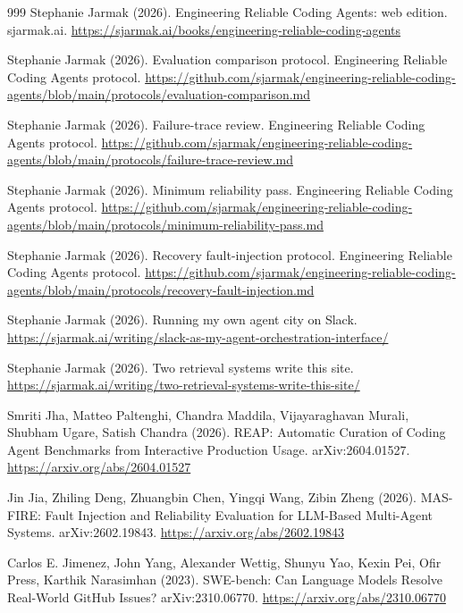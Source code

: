 \begin{thebibliography}{999}
 Stephanie Jarmak (2026). Engineering Reliable Coding Agents: web edition. sjarmak.ai. \url{https://sjarmak.ai/books/engineering-reliable-coding-agents}

 Stephanie Jarmak (2026). Evaluation comparison protocol. Engineering Reliable Coding Agents protocol. \url{https://github.com/sjarmak/engineering-reliable-coding-agents/blob/main/protocols/evaluation-comparison.md}

 Stephanie Jarmak (2026). Failure-trace review. Engineering Reliable Coding Agents protocol. \url{https://github.com/sjarmak/engineering-reliable-coding-agents/blob/main/protocols/failure-trace-review.md}

 Stephanie Jarmak (2026). Minimum reliability pass. Engineering Reliable Coding Agents protocol. \url{https://github.com/sjarmak/engineering-reliable-coding-agents/blob/main/protocols/minimum-reliability-pass.md}

 Stephanie Jarmak (2026). Recovery fault-injection protocol. Engineering Reliable Coding Agents protocol. \url{https://github.com/sjarmak/engineering-reliable-coding-agents/blob/main/protocols/recovery-fault-injection.md}

 Stephanie Jarmak (2026). Running my own agent city on Slack. \url{https://sjarmak.ai/writing/slack-as-my-agent-orchestration-interface/}

 Stephanie Jarmak (2026). Two retrieval systems write this site. \url{https://sjarmak.ai/writing/two-retrieval-systems-write-this-site/}

 Smriti Jha, Matteo Paltenghi, Chandra Maddila, Vijayaraghavan Murali, Shubham Ugare, Satish Chandra (2026). REAP: Automatic Curation of Coding Agent Benchmarks from Interactive Production Usage. arXiv:2604.01527. \url{https://arxiv.org/abs/2604.01527}

 Jin Jia, Zhiling Deng, Zhuangbin Chen, Yingqi Wang, Zibin Zheng (2026). MAS-FIRE: Fault Injection and Reliability Evaluation for LLM-Based Multi-Agent Systems. arXiv:2602.19843. \url{https://arxiv.org/abs/2602.19843}

 Carlos E. Jimenez, John Yang, Alexander Wettig, Shunyu Yao, Kexin Pei, Ofir Press, Karthik Narasimhan (2023). SWE-bench: Can Language Models Resolve Real-World GitHub Issues? arXiv:2310.06770. \url{https://arxiv.org/abs/2310.06770}


\end{thebibliography}
